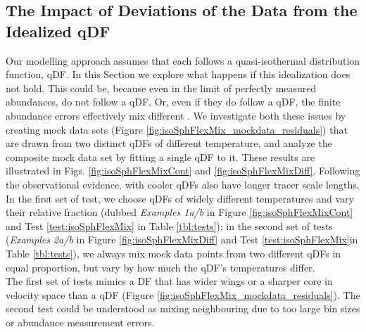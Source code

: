 \subsection{The Impact of Deviations of the Data from the Idealized qDF} \label{sec:results_mixedDFs}

Our modelling approach assumes that each \MAP{} follows a quasi-isothermal distribution function, qDF. In this Section we explore what happens if this idealization does not hold. This could be, because even in the limit of perfectly measured abundances, \MAPs{} do not follow a qDF. Or, even if they do follow a qDF, the finite abundance errors effectively mix different \MAPs{}. We investigate both these issues by creating mock data sets (Figure \ref{fig:isoSphFlexMix_mockdata_residuals}) that are drawn from two distinct qDFs of different temperature, and analyze the composite mock data set by fitting a single qDF to it. These results are illustrated in Figs. \ref{fig:isoSphFlexMixCont} and \ref{fig:isoSphFlexMixDiff}. Following the observational evidence, \MAPs{} with cooler qDFs also have longer tracer scale lengths. In the first set of test, we choose qDFs of widely different temperatures and vary their relative fraction (dubbed \emph{Examples 1a/b} in Figure \ref{fig:isoSphFlexMixCont} and Test \ref{test:isoSphFlexMix} in Table \ref{tbl:tests}); in the second set of tests (\emph{Examples 2a/b} in Figure \ref{fig:isoSphFlexMixDiff} and Test \ref{test:isoSphFlexMix}in Table \ref{tbl:tests}), we always mix mock data points from two different qDFs in equal proportion, but vary by how much the qDF's temperatures differ. 
\\The first set of tests mimics a DF that has wider wings or a sharper core in velocity space than a qDF (Figure \ref{fig:isoSphFlexMix_mockdata_residuals}). The second test could be understood as mixing neighbouring \MAPs{} due to too large bin sizes or abundance measurement errors.

